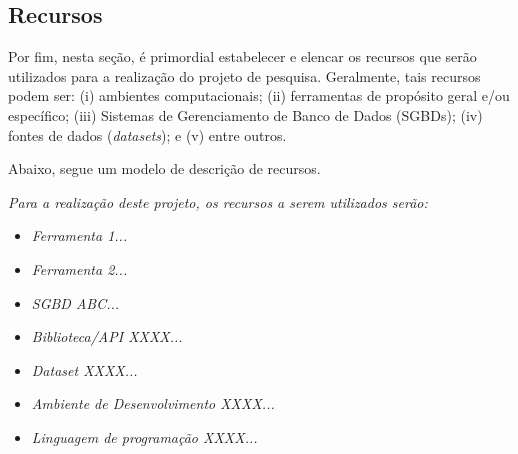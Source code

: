 \subsection{Recursos}\label{sec:recursos}

Por fim, nesta seção, é primordial estabelecer e elencar os recursos que serão utilizados para a realização do projeto de pesquisa. Geralmente, tais recursos podem ser: (i) ambientes computacionais; (ii) ferramentas de propósito geral e/ou específico; (iii) Sistemas de Gerenciamento de Banco de Dados (SGBDs); (iv) fontes de dados (\textit{datasets}); e (v) entre outros.

Abaixo, segue um modelo de descrição de recursos.

\textit{Para a realização deste projeto, os recursos a serem utilizados serão:}

\begin{itemize}[itemsep=0pt, leftmargin=2.5cm]
    \item \textit{Ferramenta 1...}
    \item \textit{Ferramenta 2...}
    \item \textit{SGBD ABC...}
    \item \textit{Biblioteca/API XXXX...}
    \item \textit{Dataset XXXX...}
    \item \textit{Ambiente de Desenvolvimento XXXX...}
    \item \textit{Linguagem de programação XXXX...}
\end{itemize}